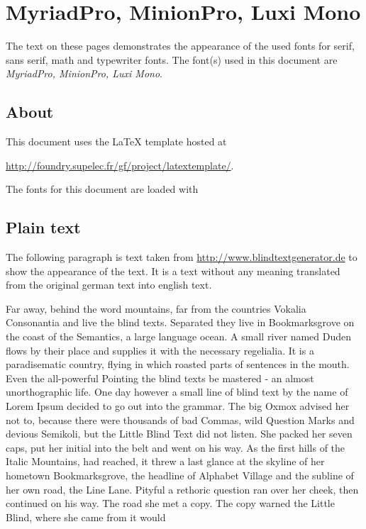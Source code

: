 \documentclass[%
   final,      %
   paper=a4,%
   paper=portrait, %
   pagesize=auto, %
   fontsize=11pt,%
   version=last, %
   english, %
 ]{scrbook} %
\newcommand{\fontcodefile}{fonts/fontcode.tex}
\newcommand{\fontdesc}{}
\renewcommand{\fontdesc}{MyriadPro, MinionPro, Luxi Mono}
\begin{document}
\mainmatter

\chapter{\fontdesc}

The text on these pages demonstrates the appearance of the used fonts for serif, sans serif, math and typewriter fonts. The font(s) used in this document are \textit{\fontdesc}.

\section{About}

This document uses the LaTeX template hosted at
%
\begin{center}
\url{http://foundry.supelec.fr/gf/project/latextemplate/}.
\end{center}
%
The fonts for this document are loaded with


\section{Plain text}
The following paragraph is text taken from \url{http://www.blindtextgenerator.de} to show the appearance of the text. It is a text without any meaning translated from the original german text into english text.

Far away, behind the word mountains, far from the countries Vokalia Consonantia and live the blind texts. Separated they live in Bookmarksgrove on the coast of the Semantics, a large language ocean. A small river named Duden flows by their place and supplies it with the necessary regelialia. It is a paradisematic country, flying in which roasted parts of sentences in the mouth. Even the all-powerful Pointing the blind texts be mastered - an almost unorthographic life. One day however a small line of blind text by the name of Lorem Ipsum decided to go out into the grammar. The big Oxmox advised her not to, because there were thousands of bad Commas, wild Question Marks and devious Semikoli, but the Little Blind Text did not listen. She packed her seven caps, put her initial into the belt and went on his way. As the first hills of the Italic Mountains, had reached, it threw a last glance at the skyline of her hometown Bookmarksgrove, the headline of Alphabet Village and the subline of her own road, the Line Lane. Pityful a rethoric question ran over her cheek, then continued on his way. The road she met a copy. The copy warned the Little Blind, where she came from it would
\end{document}
